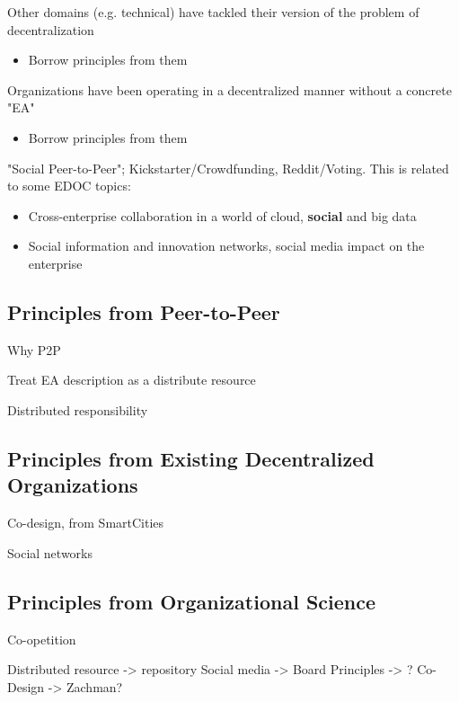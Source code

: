Other domains (e.g. technical) have tackled their version of the problem of decentralization
    \begin{itemize}
    \item Borrow principles from them
    \end{itemize}
    
    Organizations have been operating in a decentralized manner without a concrete "EA"
    \begin{itemize}
    \item Borrow principles from them
    \end{itemize}
    
    "Social Peer-to-Peer"; Kickstarter/Crowdfunding, Reddit/Voting. This is related to some EDOC topics:
    \begin{itemize}
    \item Cross-enterprise collaboration in a world of cloud, \textbf{social} and big data
    \item Social information and innovation networks, social media impact on the enterprise
    \end{itemize}

\subsection{Principles from Peer-to-Peer}

Why P2P

Treat EA description as a distribute resource

Distributed responsibility 

\subsection{Principles from Existing Decentralized Organizations}

Co-design, from SmartCities

Social networks

\subsection{Principles from Organizational Science}

Co-opetition



Distributed resource -> repository
Social media -> Board
Principles -> ?
Co-Design -> Zachman?


